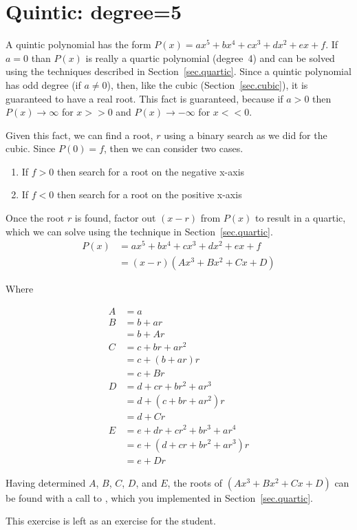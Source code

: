 \section{Quintic: degree=5}
\label{sec.quintic}

A quintic polynomial has the form $P(x) = a x^5 + b x^4 + c x^3 + d x^2 + e x + f$.
If $a=0$ than $P(x)$ is really
a quartic polynomial (degree~4) and can be solved using the techniques described in Section~\ref{sec.quartic}.
Since a quintic polynomial has odd degree (if $a\neq 0$),
then, like the cubic (Section~\ref{sec.cubic}), it is guaranteed to have a real root.  This fact
is guaranteed, because if
$a>0$ then $P(x)\to \infty$ for $x>>0$ and $P(x)\to -\infty$ for $x<<0$.

Given this fact, we can find a root, $r$ using a binary search as we did for the cubic.
Since $P(0) = f$, then we can consider two cases.
\begin{enumerate}
\item If $f>0$ then search for a root on the negative x-axis
\item If $f<0$ then search for a root on the positive x-axis
\end{enumerate}

Once the root $r$ is found, factor out $(x-r)$ from $P(x)$ to result in a quartic, which we can solve using
the technique in Section~\ref{sec.quartic}.
\begin{align*}
  P(x) &= a x^5 + b x^4 + c x^3 + d x^2 + e x + f\\
  &= (x - r) (Ax^3 + Bx^2 + Cx + D)
\end{align*}

Where

\begin{align*}
  A &= a\\
  B &= b + a r\\
   &= b + A r\\
  C &= c + b r + a r^2\\
  &= c + (b + a r)r\\
  &= c + B r\\
  D &= d + c r + b r^2 + a r^3\\
  &= d + ( c + b r + a r^2)r\\
  &= d + C r\\
  E &= e + d r + c r^2 + b r^3 + a r^4\\
  &= e + ( d + c r + b r^2 + a r^3)r\\
  &= e + D r
\end{align*}


Having determined $A$, $B$, $C$, $D$, and $E$, the roots of $(Ax^3 + Bx^2 + Cx + D)$ can be
found with a call to , which you implemented in Section~\ref{sec.quartic}.

This exercise is left as an exercise for the student.

